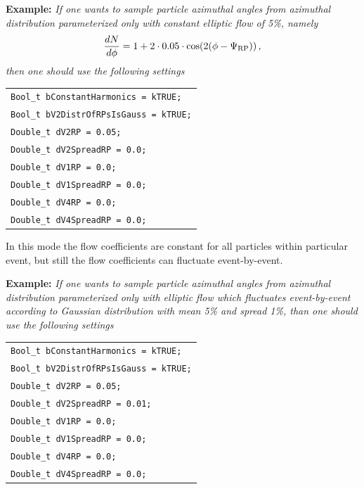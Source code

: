 \documentclass[a4paper]{book}
\numberwithin{equation}{subsection}
\begin{document}
\vspace{0.5cm}
\noindent\textbf{Example:} \textit{If one wants to sample particle azimuthal angles from azimuthal distribution parameterized only with constant elliptic flow of 5\%, namely}
%
\begin{equation}
\frac{dN}{d\phi} = 1+2\cdot 0.05\cdot\cos(2(\phi-\Psi_{\rm RP}))\,,
\end{equation}
%
\textit{then one should use the following settings}
%
\begin{center}
\begin{tabular}[t]{l}
\texttt{Bool\_t bConstantHarmonics = kTRUE;} \\
\texttt{Bool\_t bV2DistrOfRPsIsGauss = kTRUE;} \\
\texttt{Double\_t dV2RP = 0.05;} \\
\texttt{Double\_t dV2SpreadRP = 0.0;} \\
\texttt{Double\_t dV1RP = 0.0;} \\
\texttt{Double\_t dV1SpreadRP = 0.0;} \\
\texttt{Double\_t dV4RP = 0.0;} \\
\texttt{Double\_t dV4SpreadRP = 0.0;}
\end{tabular}
\end{center}
%
\vspace{0.5cm}

\noindent In this mode the flow coefficients are constant for all particles within particular event, but still the flow coefficients can fluctuate event-by-event. 

\vspace{0.5cm}
\noindent\textbf{Example:} \textit{If one wants to sample particle azimuthal angles from azimuthal distribution parameterized only with elliptic flow which fluctuates event-by-event according to Gaussian distribution with mean 5\% and spread 1\%, than one should use the following settings}
%
\begin{center}
\begin{tabular}[t]{l}
\texttt{Bool\_t bConstantHarmonics = kTRUE;} \\
\texttt{Bool\_t bV2DistrOfRPsIsGauss = kTRUE;} \\
\texttt{Double\_t dV2RP = 0.05;} \\
\texttt{Double\_t dV2SpreadRP = 0.01;} \\
\texttt{Double\_t dV1RP = 0.0;} \\
\texttt{Double\_t dV1SpreadRP = 0.0;} \\
\texttt{Double\_t dV4RP = 0.0;} \\
\texttt{Double\_t dV4SpreadRP = 0.0;}
\end{tabular}
\end{center}
%
\vspace{0.5cm}
\end{document}
